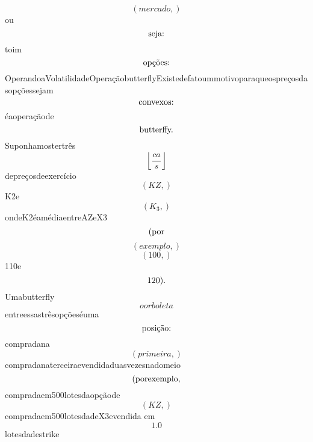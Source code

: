 \documentclass{article}
\begin{document}
\begin{equation}
\left( mercado,\right)
\end{equation}ou\begin{equation}
$seja:$
\end{equation}toim\begin{equation}
$opções:$
\end{equation}OperandoaVolatilidadeOperaçãobutterflyExistedefatoummotivoparaqueospreçosdasopçõessejam\begin{equation}
$convexos:$
\end{equation}éaoperaçãode\begin{equation}
$butterffy.$
\end{equation}Suponhamostertrês\begin{equation}
\left\lfloor{\frac{ca}{s}}\right\rfloor
\end{equation}depreçosdeexercício\begin{equation}
\left( KZ,\right)
\end{equation}K2e\begin{equation}
\left( K_{3},\right)
\end{equation}ondeK2éamédiaentreAZeX3\begin{equation}
$(por$
\end{equation}\begin{equation}
\left( exemplo,\right)
\end{equation}\begin{equation}
\left( 100,\right)
\end{equation}110e\begin{equation}
$120).$
\end{equation}Umabutterfly\begin{equation}
oorboleta
\end{equation}entreessastrêsopçõeséuma\begin{equation}
$posição:$
\end{equation}compradana\begin{equation}
\left( primeira,\right)
\end{equation}compradanaterceiraevendidaduasvezesnadomeio\begin{equation}
$(porexemplo,$
\end{equation}compradaem500lotesdaopçãode\begin{equation}
\left( KZ,\right)
\end{equation}compradaem500lotesdadeX3evendida em\begin{equation}
1.0
\end{equation}lotesdadestrike\begin{equation}

\end{equation}
\end{document}
